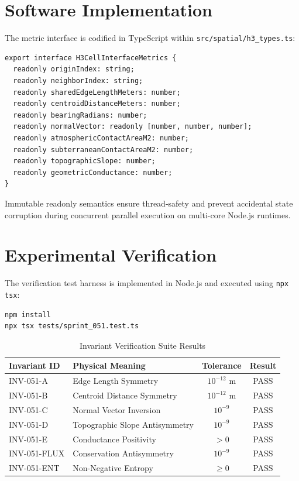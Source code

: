 \documentclass[10pt,journal,compsoc]{IEEEtran}
\begin{document}
\section{Software Implementation}
The metric interface is codified in TypeScript within \texttt{src/spatial/h3\_types.ts}:

\begin{lstlisting}
export interface H3CellInterfaceMetrics {
  readonly originIndex: string;
  readonly neighborIndex: string;
  readonly sharedEdgeLengthMeters: number;
  readonly centroidDistanceMeters: number;
  readonly bearingRadians: number;
  readonly normalVector: readonly [number, number, number];
  readonly atmosphericContactAreaM2: number;
  readonly subterraneanContactAreaM2: number;
  readonly topographicSlope: number;
  readonly geometricConductance: number;
}
\end{lstlisting}

Immutable readonly semantics ensure thread-safety and prevent accidental state corruption during concurrent parallel execution on multi-core Node.js runtimes.

\section{Experimental Verification}

The verification test harness is implemented in Node.js and executed using \texttt{npx tsx}:
\begin{lstlisting}
npm install
npx tsx tests/sprint_051.test.ts
\end{lstlisting}

\begin{table}[htbp]
\caption{Invariant Verification Suite Results}
\begin{center}
\begin{tabular}{llcc}
\toprule
\textbf{Invariant ID} & \textbf{Physical Meaning} & \textbf{Tolerance} & \textbf{Result} \\
\midrule
INV-051-A & Edge Length Symmetry & $10^{-12}$ m & PASS \\
INV-051-B & Centroid Distance Symmetry & $10^{-12}$ m & PASS \\
INV-051-C & Normal Vector Inversion & $10^{-9}$ & PASS \\
INV-051-D & Topographic Slope Antisymmetry & $10^{-9}$ & PASS \\
INV-051-E & Conductance Positivity & $> 0$ & PASS \\
INV-051-FLUX & Conservation Antisymmetry & $10^{-9}$ & PASS \\
INV-051-ENT & Non-Negative Entropy & $\ge 0$ & PASS \\
\bottomrule
\end{tabular}
\end{center}
\end{table}
\end{document}
